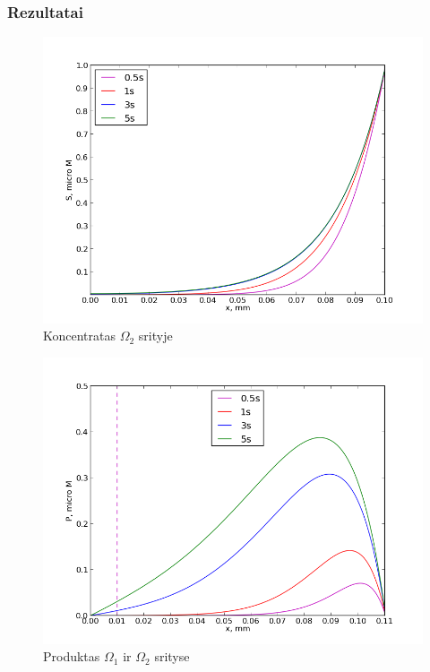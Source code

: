 \documentclass[12pt, a4paper, lithuanian]{article}
\begin{document}
\subsubsection{Rezultatai}
 \begin{figure}[H]
     \centering
     \includegraphics[scale=0.5]{img/kurS}
     \caption{Koncentratas $\Omega_2$ srityje}
     \label{img:mlp}
 \end{figure}
 
 \begin{figure}[H]
     \centering
     \includegraphics[scale=0.5]{img/kurP}
     \caption{Produktas $\Omega_1$ ir $\Omega_2$ srityse}
     \label{img:mlp}
 \end{figure}
 
\end{document}
